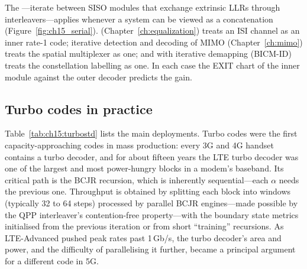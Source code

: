 The ---iterate between SISO modules that exchange extrinsic LLRs through
interleavers---applies whenever a system can be viewed as a concatenation
(Figure~\ref{fig:ch15_serial}).  (Chapter~\ref{ch:equalization}) treats an
ISI channel as an inner rate-1 code; iterative detection and decoding of MIMO
(Chapter~\ref{ch:mimo}) treats the spatial multiplexer as one; and  with iterative demapping (BICM-ID) treats the constellation labelling as one. In each
case the EXIT chart of the inner module against the outer decoder predicts the gain.


\subsection{Turbo codes in practice}

Table~\ref{tab:ch15:turbostd} lists the main deployments. Turbo codes were the first
capacity-approaching codes in mass production: every 3G and 4G handset contains a turbo decoder,
and for about fifteen years the LTE turbo decoder was one of the largest and most power-hungry
blocks in a modem's baseband. Its critical path is the BCJR recursion, which is inherently
sequential---each $\alpha$ needs the previous one. Throughput is obtained by splitting each block
into windows (typically 32 to 64 steps) processed by parallel BCJR engines---made possible by the
QPP interleaver's contention-free property---with the boundary state metrics initialised from the
previous iteration or from short ``training'' recursions. As LTE-Advanced pushed peak rates past
1\,Gb/s, the turbo decoder's area and power, and the difficulty of parallelising it further,
became a principal argument for a different code in 5G.

